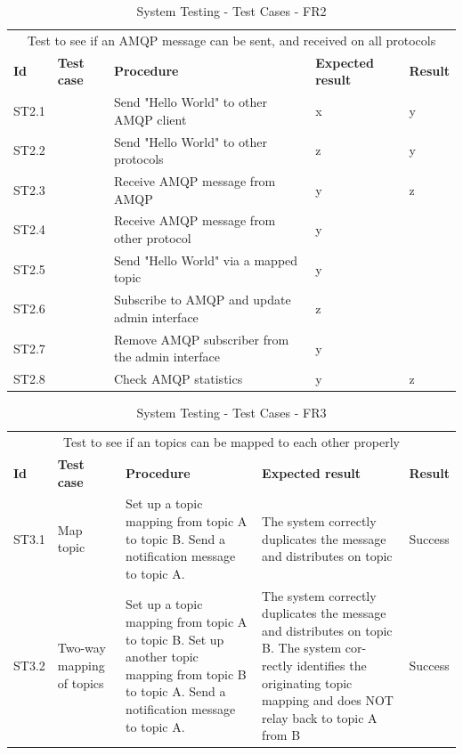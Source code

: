 \begin{table}[ht!]
\begin{tabular}{|m{1cm}|m{2cm}|m{4cm}|m{3cm}|m{1cm}|}
\hline
\rowcolor{lightgray}
\multicolumn{5}{|c|}{\textbf{FR2, AMQP}} \\ \hline
\multicolumn{5}{|c|}{{Test to see if an AMQP message can be sent, and received on all protocols}} \\ \hline
\textbf{Id} & \textbf{Test case} & \textbf{Procedure} & \textbf{Expected result} & \textbf{Result} \\ \hline
ST2.1 &&Send "Hello World" to other AMQP client & x & y \\ \hline
ST2.2 &&Send "Hello World" to other protocols &z&y \\ \hline
ST2.3 &&Receive AMQP message from AMQP &y&z \\ \hline
ST2.4 &&Receive AMQP message from other protocol &y& \\ \hline
ST2.5 &&Send "Hello World" via a mapped topic &y& \\ \hline
ST2.6 &&Subscribe to AMQP and update admin interface &z& \\ \hline
ST2.7 &&Remove AMQP subscriber from the admin interface &y& \\ \hline
ST2.8 &&Check AMQP statistics &y&z \\ \hline
\end{tabular}
\caption{System Testing - Test Cases - FR2}
\label{table:system-testing-cases-fr2}
\end{table}

\begin{table}[ht!]
\begin{tabular}{|m{1cm}|m{2cm}|m{4cm}|m{3cm}|m{1cm}|}
\hline
\rowcolor{lightgray}
\multicolumn{5}{|c|}{\textbf{FR3, Topic mapping}} \\ \hline
\multicolumn{5}{|c|}{{Test to see if an topics can be mapped to each other properly}} \\ \hline
\textbf{Id} & \textbf{Test case} & \textbf{Procedure} & \textbf{Expected result} & \textbf{Result} \\ \hline
ST3.1 & Map topic & Set up a topic mapping from topic A to topic B.
Send a notification message to topic A. & The  system  correctly  duplicates  the  message
and distributes on topic & Success \\ \hline
ST3.2 & Two-way mapping of topics & Set up a topic mapping from topic A to topic
B. Set up another topic mapping from topic B
to topic A. Send a notification message to topic
A. & The  system  correctly  duplicates  the  message
and  distributes  on  topic  B.  The  system  cor-
rectly identifies the originating topic mapping
and does NOT relay back to topic A from B & Success \\ \hline

\end{tabular}
\caption{System Testing - Test Cases - FR3}
\label{table:system-testing-cases-fr3}
\end{table}


